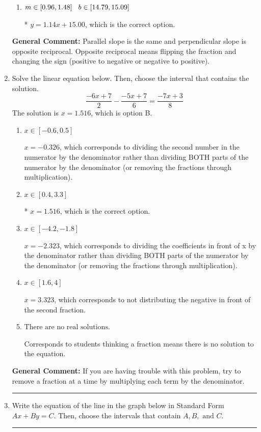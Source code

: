 \documentclass{extbook}[14pt]
\newcommand{\litem}[1]{\item #1

\rule{\textwidth}{0.4pt}}
\begin{document}
\begin{enumerate}
{\begin{enumerate}[label=\Alph*.]
 $y = 0.88x + 15.00$, which corresponds to using the reciprocal slope $(1/m)$.
\item \( m \in [0.96, 1.48] \hspace*{3mm} b \in [14.79, 15.09] \)

* $y = 1.14x + 15.00$, which is the correct option.
\end{enumerate}

\textbf{General Comment:} Parallel slope is the same and perpendicular slope is opposite reciprocal. Opposite reciprocal means flipping the fraction and changing the sign (positive to negative or negative to positive).
}
\litem{
Solve the linear equation below. Then, choose the interval that contains the solution.
\[ \frac{-6x + 7}{2} - \frac{-5x + 7}{6} = \frac{-7x + 3}{8} \]The solution is \( x = 1.516 \), which is option B.\begin{enumerate}[label=\Alph*.]
\item \( x \in [-0.6, 0.5] \)

 $x = -0.326$, which corresponds to dividing the second number in the numerator by the denominator rather than dividing BOTH parts of the numerator by the denominator (or removing the fractions through multiplication).
\item \( x \in [0.4, 3.3] \)

* $x = 1.516$, which is the correct option.
\item \( x \in [-4.2, -1.8] \)

 $x = -2.323$, which corresponds to dividing the coefficients in front of x by the denominator rather than dividing BOTH parts of the numerator by the denominator (or removing the fractions through multiplication).
\item \( x \in [1.6, 4] \)

 $x = 3.323$, which corresponds to not distributing the negative in front of the second fraction.
\item \( \text{There are no real solutions.} \)

Corresponds to students thinking a fraction means there is no solution to the equation.
\end{enumerate}

\textbf{General Comment:} If you are having trouble with this problem, try to remove a fraction at a time by multiplying each term by the denominator.
}
\litem{
Write the equation of the line in the graph below in Standard Form $Ax+By=C$. Then, choose the intervals that contain $A, B, \text{ and } C$.

}
\end{enumerate}
\end{document}
